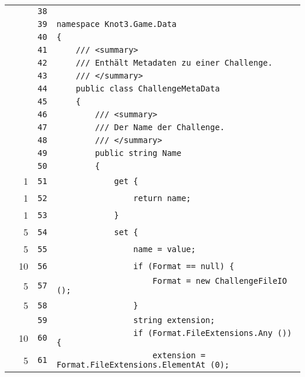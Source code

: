 \documentclass[a4paper,10pt]{article}
\begin{document}
\begin{longtable}[l]{lrrl}
\cellcolor{gray} &  & \verb~38~ & \verb~~\\
\cellcolor{gray} &  & \verb~39~ & \verb~namespace Knot3.Game.Data~\\
\cellcolor{gray} &  & \verb~40~ & \verb~{~\\
\cellcolor{gray} &  & \verb~41~ & \verb~    /// <summary>~\\
\cellcolor{gray} &  & \verb~42~ & \verb~    /// Enthält Metadaten zu einer Challenge.~\\
\cellcolor{gray} &  & \verb~43~ & \verb~    /// </summary>~\\
\cellcolor{gray} &  & \verb~44~ & \verb~    public class ChallengeMetaData~\\
\cellcolor{gray} &  & \verb~45~ & \verb~    {~\\
\cellcolor{gray} &  & \verb~46~ & \verb~        /// <summary>~\\
\cellcolor{gray} &  & \verb~47~ & \verb~        /// Der Name der Challenge.~\\
\cellcolor{gray} &  & \verb~48~ & \verb~        /// </summary>~\\
\cellcolor{gray} &  & \verb~49~ & \verb~        public string Name~\\
\cellcolor{gray} &  & \verb~50~ & \verb~        {~\\
\cellcolor{green} & 1 & \verb~51~ & \verb~            get {~\\
\cellcolor{green} & 1 & \verb~52~ & \verb~                return name;~\\
\cellcolor{green} & 1 & \verb~53~ & \verb~            }~\\
\cellcolor{green} & 5 & \verb~54~ & \verb~            set {~\\
\cellcolor{green} & 5 & \verb~55~ & \verb~                name = value;~\\
\cellcolor{green} & 10 & \verb~56~ & \verb~                if (Format == null) {~\\
\cellcolor{green} & 5 & \verb~57~ & \verb~                    Format = new ChallengeFileIO ();~\\
\cellcolor{green} & 5 & \verb~58~ & \verb~                }~\\
\cellcolor{gray} &  & \verb~59~ & \verb~                string extension;~\\
\cellcolor{green} & 10 & \verb~60~ & \verb~                if (Format.FileExtensions.Any ()) {~\\
\cellcolor{green} & 5 & \verb~61~ & \verb~                    extension = Format.FileExtensions.ElementAt (0);~\\

\end{longtable}
\end{document}
